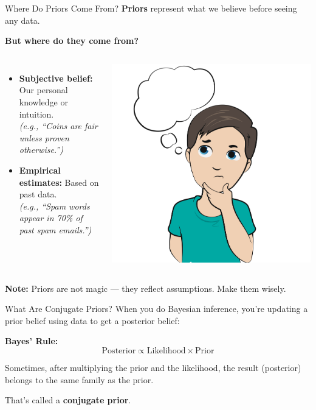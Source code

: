 \documentclass[handout,aspectratio=169]{beamer}
\begin{document}
\begin{frame}{Where Do Priors Come From?}
  \textbf{Priors} represent what we believe before seeing any data.

  \vspace{1em}
  \textbf{But where do they come from?}

    \begin{columns}
\begin{itemize}
    \item \textbf{Subjective belief:} Our personal knowledge or intuition.\\
    \textit{(e.g., “Coins are fair unless proven otherwise.”)}
    
    \item \textbf{Empirical estimates:} Based on past data.\\
    \textit{(e.g., “Spam words appear in 70\% of past spam emails.”)}
  \end{itemize}
  
    \includegraphics[width=0.6\linewidth]{chapter_figs/01_figs/prior.png}
\end{columns}
  

  \vspace{1em}
  \textbf{Note:} Priors are not magic — they reflect assumptions. Make them wisely.
\end{frame}

\begin{frame}{What Are Conjugate Priors?}
  When you do Bayesian inference, you're updating a prior belief using data to get a posterior belief:

  \vspace{1em}
  \textbf{Bayes' Rule:}
  \[
    \text{Posterior} \propto \text{Likelihood} \times \text{Prior}
  \]

  \vspace{1em}
  Sometimes, after multiplying the prior and the likelihood, the result (posterior) belongs to the same family as the prior.

  \vspace{1em}
  That’s called a \textbf{conjugate prior}.
\end{frame}
\end{document}
